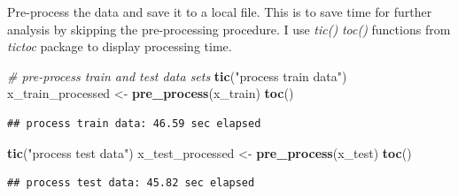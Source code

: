 \documentclass[]{article}
\newenvironment{Shaded}{\begin{snugshade}}{\end{snugshade}}
\newcommand{\CommentTok}[1]{\textcolor[rgb]{0.56,0.35,0.01}{\textit{#1}}}
\newcommand{\ControlFlowTok}[1]{\textcolor[rgb]{0.13,0.29,0.53}{\textbf{#1}}}
\newcommand{\DataTypeTok}[1]{\textcolor[rgb]{0.13,0.29,0.53}{#1}}
\newcommand{\KeywordTok}[1]{\textcolor[rgb]{0.13,0.29,0.53}{\textbf{#1}}}
\newcommand{\NormalTok}[1]{#1}
\newcommand{\OperatorTok}[1]{\textcolor[rgb]{0.81,0.36,0.00}{\textbf{#1}}}
\newcommand{\StringTok}[1]{\textcolor[rgb]{0.31,0.60,0.02}{#1}}
\begin{document}
Pre-process the data and save it to a local file. This is to save time
for further analysis by skipping the pre-processing procedure. I use
\emph{tic()} \emph{toc()} functions from \emph{tictoc} package to
display processing time.

\begin{Shaded}
\begin{Highlighting}[]
\CommentTok{# pre-process train and test data sets}
\KeywordTok{tic}\NormalTok{(}\StringTok{"process train data"}\NormalTok{)}
\NormalTok{x_train_processed <-}\StringTok{ }\KeywordTok{pre_process}\NormalTok{(x_train)}
\KeywordTok{toc}\NormalTok{()}
\end{Highlighting}
\end{Shaded}

\begin{verbatim}
## process train data: 46.59 sec elapsed
\end{verbatim}

\begin{Shaded}
\begin{Highlighting}[]
\KeywordTok{tic}\NormalTok{(}\StringTok{"process test data"}\NormalTok{)}
\NormalTok{x_test_processed <-}\StringTok{ }\KeywordTok{pre_process}\NormalTok{(x_test)}
\KeywordTok{toc}\NormalTok{()}
\end{Highlighting}
\end{Shaded}

\begin{verbatim}
## process test data: 45.82 sec elapsed
\end{verbatim}

\begin{Shaded}
\end{Shaded}
\end{document}
